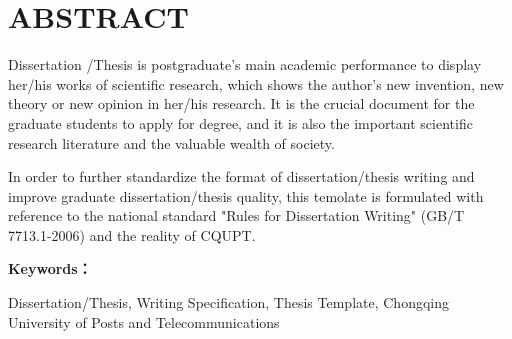 



\chapter{ABSTRACT}
\xiaosi

Dissertation /Thesis is postgraduate’s main academic performance to display her/his works of scientific research, which shows the author’s new invention, new theory or new opinion in her/his research. It is the crucial document for the graduate students to apply for degree, and it is also the important scientific research literature and the valuable wealth of society.

In order to further standardize the format of dissertation/thesis writing and improve graduate dissertation/thesis quality, this temolate is formulated with reference to the national standard "Rules for Dissertation Writing" (GB/T 7713.1-2006) and the reality of CQUPT.


\noindent\textbf{Keywords：} 
\begin{minipage}[t]{0.85\linewidth}
	Dissertation/Thesis, Writing Specification, Thesis Template, Chongqing University of Posts and Telecommunications
\end{minipage}

\clearpage